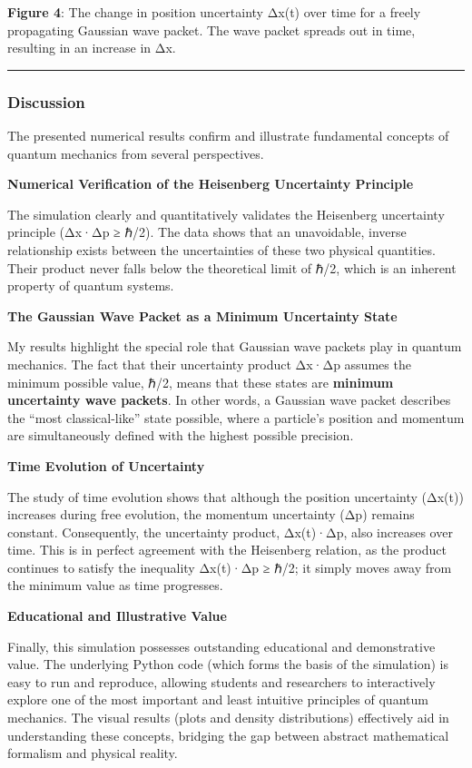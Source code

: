 \documentclass[
]{article}
\begin{document}
\textbf{Figure 4}: The change in position uncertainty Δx(t) over time
for a freely propagating Gaussian wave packet. The wave packet spreads
out in time, resulting in an increase in Δx.

\begin{center}\rule{0.5\linewidth}{0.5pt}\end{center}

\subsubsection{Discussion}\label{discussion}

The presented numerical results confirm and illustrate fundamental
concepts of quantum mechanics from several perspectives.

\textbf{Numerical Verification of the Heisenberg Uncertainty Principle}

The simulation clearly and quantitatively validates the Heisenberg
uncertainty principle (Δx·Δp ≥ ℏ/2). The data shows that an unavoidable,
inverse relationship exists between the uncertainties of these two
physical quantities. Their product never falls below the theoretical
limit of ℏ/2, which is an inherent property of quantum systems.

\textbf{The Gaussian Wave Packet as a Minimum Uncertainty State}

My results highlight the special role that Gaussian wave packets play in
quantum mechanics. The fact that their uncertainty product Δx·Δp assumes
the minimum possible value, ℏ/2, means that these states are
\textbf{minimum uncertainty wave packets}. In other words, a Gaussian
wave packet describes the ``most classical-like'' state possible, where
a particle's position and momentum are simultaneously defined with the
highest possible precision.

\textbf{Time Evolution of Uncertainty}

The study of time evolution shows that although the position uncertainty
(Δx(t)) increases during free evolution, the momentum uncertainty (Δp)
remains constant. Consequently, the uncertainty product, Δx(t)·Δp, also
increases over time. This is in perfect agreement with the Heisenberg
relation, as the product continues to satisfy the inequality Δx(t)·Δp ≥
ℏ/2; it simply moves away from the minimum value as time progresses.

\textbf{Educational and Illustrative Value}

Finally, this simulation possesses outstanding educational and
demonstrative value. The underlying Python code (which forms the basis
of the simulation) is easy to run and reproduce, allowing students and
researchers to interactively explore one of the most important and least
intuitive principles of quantum mechanics. The visual results (plots and
density distributions) effectively aid in understanding these concepts,
bridging the gap between abstract mathematical formalism and physical
reality.
\end{document}
